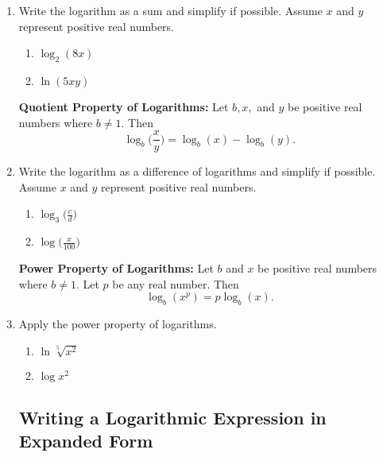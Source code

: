 \begin{enumerate}
\item Write the logarithm as a sum and simplify if possible.  Assume $x$ and $y$ represent positive real numbers. \\
\begin{enumerate}
\item $\log_2 (8x)$\\[.2in]
\item $\ln (5xy)$\\[.2in]
\end{enumerate}

\noindent \textbf{Quotient Property of Logarithms:} Let $b, x,$ and $y$ be positive real numbers where $b \neq 1.$  Then $$\log_b \Bigg(\frac{x}{y}\Bigg)=\log_b (x) - \log_b(y).$$   



\item Write the logarithm as a difference of logarithms and simplify if possible.  Assume $x$ and $y$ represent positive real numbers. \\
\begin{enumerate}
\item $\displaystyle \log_3 \Bigg(\frac{c}{d}\Bigg)$\\[.2in]
\item $\displaystyle \log \Bigg(\frac{x}{100}\Bigg)$\\[.2in]
\end{enumerate}


\noindent \textbf{Power Property of Logarithms:} Let $b$ and $x$ be positive real numbers where $b \neq 1.$ Let $p$ be any real number. Then $$\log_b (x^p)=p \log_b (x).$$   



\item Apply the power property of logarithms. \\
\begin{enumerate}
\item $\displaystyle\ln \sqrt[5]{x^2}$\\[.2in]
\item $\displaystyle \log x^2$\\[.2in]
\end{enumerate}








\subsection{Writing a Logarithmic Expression in Expanded Form}


\end{enumerate}
